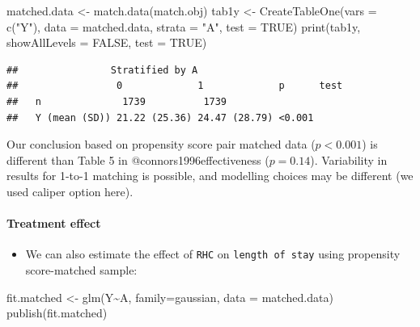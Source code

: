 \documentclass[
]{book}
\newenvironment{Shaded}{\begin{snugshade}}{\end{snugshade}}
\newcommand{\AttributeTok}[1]{\textcolor[rgb]{0.77,0.63,0.00}{#1}}
\newcommand{\ConstantTok}[1]{\textcolor[rgb]{0.00,0.00,0.00}{#1}}
\newcommand{\FunctionTok}[1]{\textcolor[rgb]{0.00,0.00,0.00}{#1}}
\newcommand{\NormalTok}[1]{#1}
\newcommand{\OtherTok}[1]{\textcolor[rgb]{0.56,0.35,0.01}{#1}}
\newcommand{\SpecialCharTok}[1]{\textcolor[rgb]{0.00,0.00,0.00}{#1}}
\newcommand{\StringTok}[1]{\textcolor[rgb]{0.31,0.60,0.02}{#1}}
\providecommand{\tightlist}{%
  \setlength{\itemsep}{0pt}\setlength{\parskip}{0pt}}
\begin{document}
\begin{Shaded}
\begin{Highlighting}[]
\NormalTok{matched.data }\OtherTok{\textless{}{-}} \FunctionTok{match.data}\NormalTok{(match.obj)   }
\NormalTok{tab1y }\OtherTok{\textless{}{-}} \FunctionTok{CreateTableOne}\NormalTok{(}\AttributeTok{vars =} \FunctionTok{c}\NormalTok{(}\StringTok{"Y"}\NormalTok{),}
               \AttributeTok{data =}\NormalTok{ matched.data, }\AttributeTok{strata =} \StringTok{"A"}\NormalTok{, }
               \AttributeTok{test =} \ConstantTok{TRUE}\NormalTok{)}
\FunctionTok{print}\NormalTok{(tab1y, }\AttributeTok{showAllLevels =} \ConstantTok{FALSE}\NormalTok{, }
      \AttributeTok{test =} \ConstantTok{TRUE}\NormalTok{)}
\end{Highlighting}
\end{Shaded}

\begin{verbatim}
##                Stratified by A
##                 0             1             p      test
##   n              1739          1739                    
##   Y (mean (SD)) 21.22 (25.36) 24.47 (28.79) <0.001
\end{verbatim}

\begin{rmdcomment}
Our conclusion based on propensity score pair matched data
(\(p \lt 0.001\)) is different than Table 5 in @connors1996effectiveness
(\(p = 0.14\)). Variability in results for 1-to-1 matching is possible,
and modelling choices may be different (we used caliper option here).
\end{rmdcomment}

\hypertarget{treatment-effect}{%
\paragraph{Treatment effect}\label{treatment-effect}}

\begin{itemize}
\tightlist
\item
  We can also estimate the effect of \texttt{RHC} on \texttt{length\ of\ stay} using propensity score-matched sample:
\end{itemize}

\begin{Shaded}
\begin{Highlighting}[]
\NormalTok{fit.matched }\OtherTok{\textless{}{-}} \FunctionTok{glm}\NormalTok{(Y}\SpecialCharTok{\textasciitilde{}}\NormalTok{A,}
            \AttributeTok{family=}\NormalTok{gaussian,  }
            \AttributeTok{data =}\NormalTok{ matched.data)  }
\FunctionTok{publish}\NormalTok{(fit.matched)}
\end{Highlighting}
\end{Shaded}
\end{document}
